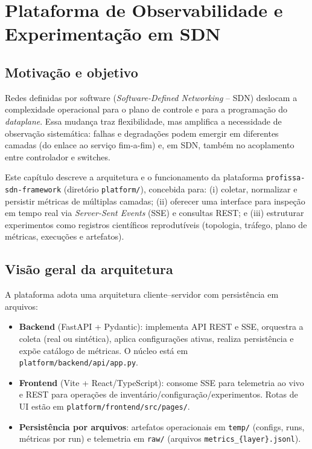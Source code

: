 \documentclass[12pt,oneside]{report}
\begin{document}
\chapter{Plataforma de Observabilidade e Experimenta\c{c}\~ao em SDN}\label{ch:plataforma-observabilidade-sdn}

\section{Motiva\c{c}\~ao e objetivo}
Redes definidas por software (\textit{Software-Defined Networking} -- SDN) deslocam a complexidade operacional para o plano de controle e para a programa\c{c}\~ao do \textit{dataplane}. Essa mudan\c{c}a traz flexibilidade, mas amplifica a necessidade de observa\c{c}\~ao sistem\'atica: falhas e degrada\c{c}\~oes podem emergir em diferentes camadas (do enlace ao servi\c{c}o fim-a-fim) e, em SDN, tamb\'em no acoplamento entre controlador e switches.

Este cap\'itulo descreve a arquitetura e o funcionamento da plataforma \texttt{profissa-sdn-framework} (diret\'orio \texttt{platform/}), concebida para: (i) coletar, normalizar e persistir m\'etricas de m\'ultiplas camadas; (ii) oferecer uma interface para inspe\c{c}\~ao em tempo real via \textit{Server-Sent Events} (SSE) e consultas REST; e (iii) estruturar experimentos como registros cient\'ificos reprodut\'iveis (topologia, tr\'afego, plano de m\'etricas, execu\c{c}\~oes e artefatos).

\section{Vis\~ao geral da arquitetura}
A plataforma adota uma arquitetura cliente--servidor com persist\^encia em arquivos:

\begin{itemize}
\item \textbf{Backend} (FastAPI + Pydantic): implementa API REST e SSE, orquestra a coleta (real ou sint\'etica), aplica configura\c{c}\~oes ativas, realiza persist\^encia e exp\~oe cat\'alogo de m\'etricas. O n\'ucleo est\'a em \texttt{platform/backend/api/app.py}.
\item \textbf{Frontend} (Vite + React/TypeScript): consome SSE para telemetria ao vivo e REST para opera\c{c}\~oes de invent\'ario/configura\c{c}\~ao/experimentos. Rotas de UI est\~ao em \texttt{platform/frontend/src/pages/}.
\item \textbf{Persist\^encia por arquivos}: artefatos operacionais em \texttt{temp/} (configs, runs, m\'etricas por run) e telemetria em \texttt{raw/} (arquivos \texttt{metrics\_\{layer\}.jsonl}).
\end{itemize}
\end{document}
